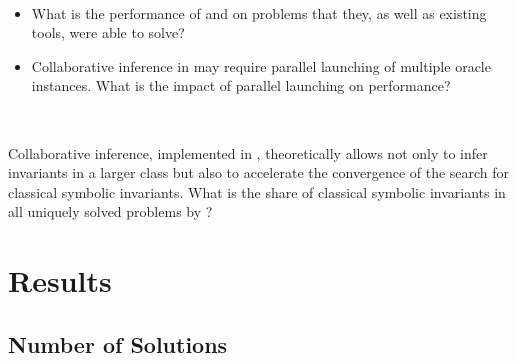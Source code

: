 \begin{resquest}[Performance]\label{rq:perf}
$ $

\begin{itemize}
    \item What is the performance of \theringen{} and \ringenSync{} on problems that they, as well as existing tools, were able to solve?
    \item Collaborative inference in \theringenCICI{} may require parallel launching of multiple oracle instances. What is the impact of parallel launching on performance?

\end{itemize}
\end{resquest}

\begin{resquest}\label{rq:char}
$ $

Collaborative inference, implemented in \theringenCICI{}, theoretically allows not only to infer invariants in a larger class but also to accelerate the convergence of the search for classical symbolic invariants. What is the share of classical symbolic invariants in all uniquely solved problems by \theringenCICI{}?
\end{resquest}



\section{Results}



\subsection{Number of Solutions}

